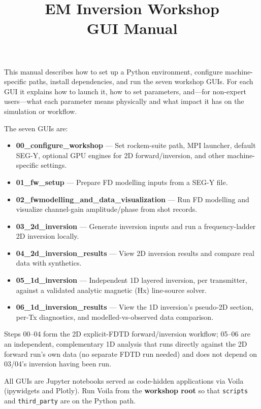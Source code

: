 \documentclass[11pt,a4paper]{article}
\title{EM Inversion Workshop\\GUI Manual}
\author{}
\date{}
\begin{document}
\maketitle

This manual describes how to set up a Python environment, configure machine-specific paths, install dependencies, and run the seven workshop GUIs. For each GUI it explains how to launch it, how to set parameters, and—for non-expert users—what each parameter means physically and what impact it has on the simulation or workflow.

The seven GUIs are:
\begin{itemize}
  \item \textbf{00\_configure\_workshop} — Set rockem-suite path, MPI launcher, default SEG-Y, optional GPU engines for 2D forward/inversion, and other machine-specific settings.
  \item \textbf{01\_fw\_setup} — Prepare FD modelling inputs from a SEG-Y file.
  \item \textbf{02\_fwmodelling\_and\_data\_visualization} — Run FD modelling and visualize channel-gain amplitude/phase from shot records.
  \item \textbf{03\_2d\_inversion} — Generate inversion inputs and run a frequency-ladder 2D inversion locally.
  \item \textbf{04\_2d\_inversion\_results} — View 2D inversion results and compare real data with synthetics.
  \item \textbf{05\_1d\_inversion} — Independent 1D layered inversion, per transmitter, against a validated analytic magnetic (Hx) line-source solver.
  \item \textbf{06\_1d\_inversion\_results} — View the 1D inversion's pseudo-2D section, per-Tx diagnostics, and modelled-vs-observed data comparison.
\end{itemize}

Steps 00--04 form the 2D explicit-FDTD forward/inversion workflow; 05--06 are an independent, complementary 1D analysis that runs directly against the 2D forward run's own data (no separate FDTD run needed) and does not depend on 03/04's inversion having been run.

All GUIs are Jupyter notebooks served as code-hidden applications via Voila (ipywidgets and Plotly). Run Voila from the \textbf{workshop root} so that \texttt{scripts} and \texttt{third\_party} are on the Python path.

\end{document}
